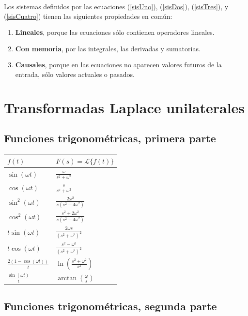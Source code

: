 Los sistemas definidos por las ecuaciones (\ref{sisUno}), (\ref{sisDos}), (\ref{sisTres}), y (\ref{sisCuatro}) tienen las siguientes propiedades en com\'{u}n:

\begin{enumerate}
	\item \textbf{Lineales}, porque las ecuaciones s\'{o}lo contienen operadores lineales.
	\item \textbf{Con memoria}, por las integrales, las derivadas y sumatorias.
	\item \textbf{Causales}, porque en las ecuaciones no aparecen valores futuros de la entrada, s\'{o}lo valores actuales o pasados.
\end{enumerate}

\section{Transformadas Laplace unilaterales}

\subsection{Funciones trigonom\'{e}tricas, primera parte}

\begin{center}
	\renewcommand{\arraystretch}{1.8}
	\begin{tabular}{ll}
		\textbf{$f(t)$} & \textbf{$F(s) = \mathcal{L}\{f(t)\}$} \\ \hline
		$\sin(\omega t)$ & $\frac{\omega }{s^{2}+\omega ^{2}}$ \\ 
		$\cos(\omega t)$ & $\frac{s}{s^{2}+\omega ^{2}}$ \\ 
		$\sin^{2}(\omega t)$ & $\frac{2\omega ^{2}}{s(s^{2}+4\omega ^{2})}$ \\ 
		$\cos^{2}(\omega t)$ & $\frac{s^{2}+2\omega ^{2}}{s(s^{2}+4\omega ^{2})}$ \\ 
		$t\sin(\omega t)$ & $\frac{2\omega s}{(s^{2}+\omega^{2})^{2}}$ \\ 
		$t\cos(\omega t)$ & $\frac{s^{2}-\omega ^{2}}{(s^{2}+\omega^{2})^{2}}$ \\ 
		$\frac{2(1-\cos(\omega t))}{t}$ & $\ln \left( \frac{s^{2}+\omega ^{2}}{s^{2}} \right)$ \\ 
		$\frac{\sin(\omega t)}{t}$ & $\arctan \left(\frac{\omega }{s}\right)$
	\end{tabular}
\end{center}

\subsection{Funciones trigonom\'{e}tricas, segunda parte} 

